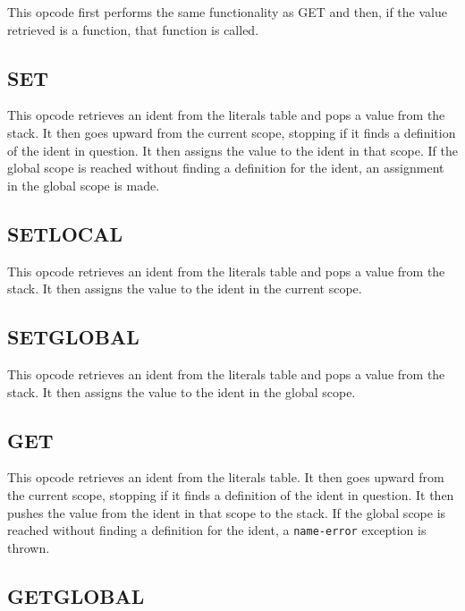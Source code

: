 This opcode first performs the same functionality as GET and then, if
the value retrieved is a function, that function is called.

\subsection{SET}
\label{sec:set}

This opcode retrieves an ident from the literals table and pops a
value from the stack. It then goes upward from the current scope,
stopping if it finds a definition of the ident in question. It then
assigns the value to the ident in that scope. If the global scope is
reached without finding a definition for the ident, an assignment in the
global scope is made.

\subsection{SET\textunderscore{}LOCAL}
\label{sec:set-local}

This opcode retrieves an ident from the literals table and pops a
value from the stack. It then assigns the value to the ident in the
current scope.

\subsection{SET\textunderscore{}GLOBAL}
\label{sec:set-global}

This opcode retrieves an ident from the literals table and pops a
value from the stack. It then assigns the value to the ident in the
global scope.

\subsection{GET}
\label{sec:get}

This opcode retrieves an ident from the literals table. It then goes
upward from the current scope, stopping if it finds a definition of the
ident in question. It then pushes the value from the ident in that scope
to the stack. If the global scope is reached without finding a
definition for the ident, a \verb!name-error! exception is thrown.

\subsection{GET\textunderscore{}GLOBAL}
\label{sec:get-global}

